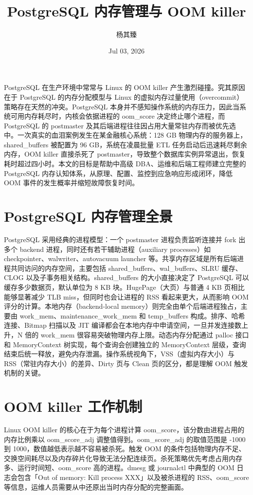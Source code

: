 \title{PostgreSQL 内存管理与 OOM killer}
\author{杨其臻}
\date{Jul 03, 2026}
\maketitle
PostgreSQL 在生产环境中常常与 Linux 的 OOM killer 产生激烈碰撞。究其原因在于 PostgreSQL 的内存分配模型与 Linux 的虚拟内存过量使用（overcommit）策略存在天然的冲突。PostgreSQL 本身并不感知操作系统的内存压力，因此当系统可用内存耗尽时，内核会依据进程的 oom\_{}score 决定终止哪个进程，而 PostgreSQL 的 postmaster 及其后端进程往往因占用大量常驻内存而被优先选中。一次真实的血泪案例发生在某金融核心系统：128 GB 物理内存的服务器上，shared\_{}buffers 被配置为 96 GB，系统在凌晨批量 ETL 任务启动后迅速耗尽剩余内存，OOM killer 直接杀死了 postmaster，导致整个数据库实例异常退出，恢复耗时超过四小时。本文的目标是帮助中高级 DBA、运维和后端工程师建立完整的 PostgreSQL 内存认知体系，从原理、配置、监控到应急响应形成闭环，降低 OOM 事件的发生概率并缩短故障恢复时间。\par
\chapter{PostgreSQL 内存管理全景}
PostgreSQL 采用经典的进程模型：一个 postmaster 进程负责监听连接并 fork 出多个 backend 进程，同时还有若干辅助进程（auxiliary processes）如 checkpointer、walwriter、autovacuum launcher 等。共享内存区域是所有后端进程共同访问的内存空间，主要包括 shared\_{}buffers、wal\_{}buffers、SLRU 缓存、CLOG 以及子事务相关结构。shared\_{}buffers 的大小直接决定了 PostgreSQL 可以缓存多少数据页，默认单位为 8 KB 块。HugePage（大页）与普通 4 KB 页相比能够显著减少 TLB miss，但同时也会让进程的 RSS 看起来更大，从而影响 OOM 评分的计算。本地内存（backend-local memory）则完全由单个后端进程独占，主要由 work\_{}mem、maintenance\_{}work\_{}mem 和 temp\_{}buffers 构成。排序、哈希连接、Bitmap 扫描以及 JIT 编译都会在本地内存中申请空间，一旦并发连接数上升，N 倍的 work\_{}mem 很容易突破物理内存上限。动态内存分配通过 palloc 接口和 MemoryContext 树实现，每个查询会创建独立的 MemoryContext 层级，查询结束后统一释放，避免内存泄漏。操作系统视角下，VSS（虚拟内存大小）与 RSS（常驻内存大小）的差异、Dirty 页与 Clean 页的区分，都是理解 OOM 触发机制的关键。\par
\chapter{OOM killer 工作机制}
Linux OOM killer 的核心在于为每个进程计算 oom\_{}score，该分数由进程占用的内存比例乘以 oom\_{}score\_{}adj 调整值得到。oom\_{}score\_{}adj 的取值范围是 -1000 到 1000，数值越低表示越不容易被杀死。触发 OOM 的条件包括物理内存不足、交换空间耗尽以及内存碎片化导致无法分配连续页。杀死策略优先考虑占用内存多、运行时间短、oom\_{}score 高的进程。dmesg 或 journalctl 中典型的 OOM 日志会包含「Out of memory: Kill process XXX」以及被杀进程的 RSS、oom\_{}score 等信息，运维人员需要从中还原出当时内存分配的完整画面。\par
